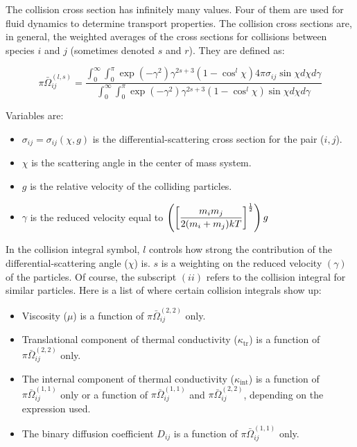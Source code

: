 \documentclass[10pt]{article}
\begin{document}
\begin{flushleft}
\begin{definition}
    The collision cross section has infinitely many values. Four of them are used for fluid dynamics to determine transport properties. The collision cross sections are, in general, the weighted averages of the cross sections for collisions between species $i$ and $j$ (sometimes denoted $s$ and $r$). They are defined as:
    
    \begin{equation}
        \pi \bar{\Omega}_{ij}^{(l,s)} = \frac{\int_{0}^{\infty} \int_{0}^{\pi} \exp(-\gamma^2) \gamma^{2s+3}(1 - \cos^l \chi) 4 \pi \sigma_{ij} \sin\chi d \chi d\gamma}{\int_{0}^{\infty} \int_{0}^{\pi} \exp(-\gamma^2) \gamma^{2s + 3} (1 - \cos^l{\chi}) \sin{\chi} d\chi d \gamma }
    \end{equation}

    Variables are:

    \begin{itemize}
        \item $\sigma_{ij} = \sigma_{ij}(\chi, g)$ is the differential-scattering cross section for the pair ($i,j$).
        \item $\chi$ is the scattering angle in the center of mass system.
        \item $g$ is the relative velocity of the colliding particles.
        \item $\gamma$ is the reduced velocity equal to $\displaystyle \left(  \left[ \frac{m_i m_j}{2(m_i + m_j)kT} \right]^\frac{1}{2}  \right)g$
    \end{itemize}

    In the collision integral symbol, $l$ controls how strong the contribution of the differential-scattering angle ($\chi$) is. $s$ is a weighting on the reduced velocity $(\gamma)$ of the particles. Of course, the subscript $(ii)$ refers to the collision integral for similar particles. Here is a list of where certain collision integrals show up:

    \begin{itemize}
        \item Viscosity ($\mu$) is a function of $\pi \bar{\Omega}_{ij}^{(2,2)}$ only.
        \item Translational component of thermal conductivity ($\kappa_\text{tr}$) is a function of $\pi \bar{\Omega}_{ij}^{(2,2)}$ only.
        \item The internal component of thermal conductivity ($\kappa_\text{int}$) is a function of $\pi \bar{\Omega}_{ij}^{(1,1)}$ only or a function of $\pi \bar{\Omega}_{ij}^{(1,1)}$ and $\pi \bar{\Omega}_{ij}^{(2,2)}$, depending on the expression used.
        \item The binary diffusion coefficient $D_{ij}$ is a function of $\pi \bar{\Omega}_{ij}^{(1,1)}$ only.
    \end{itemize}
\end{definition}



\end{flushleft}
\end{document}
